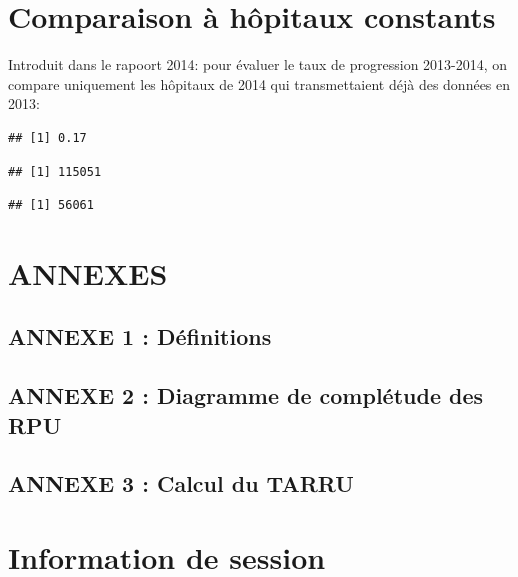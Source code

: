 \documentclass[]{article}
\begin{document}
\section{Comparaison à hôpitaux
constants}\label{comparaison-a-hopitaux-constants}

Introduit dans le rapoort 2014: pour évaluer le taux de progression
2013-2014, on compare uniquement les hôpitaux de 2014 qui transmettaient
déjà des données en 2013:

\begin{verbatim}
## [1] 0.17
\end{verbatim}

\begin{verbatim}
## [1] 115051
\end{verbatim}

\begin{verbatim}
## [1] 56061
\end{verbatim}

\section{ANNEXES}\label{annexes}

\subsection{ANNEXE 1 : Définitions}\label{annexe-1-definitions}

\subsection{ANNEXE 2 : Diagramme de complétude des
RPU}\label{annexe-2-diagramme-de-completude-des-rpu}

\subsection{ANNEXE 3 : Calcul du TARRU}\label{annexe-3-calcul-du-tarru}

\section{Information de session}\label{information-de-session}
\end{document}
